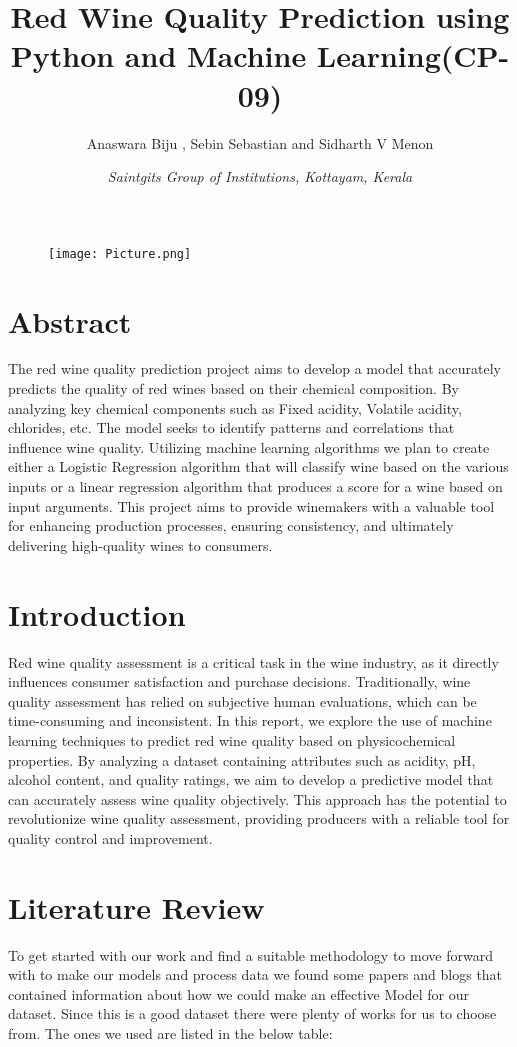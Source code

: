 \documentclass{article}
\title{\textbf{Red Wine Quality Prediction using Python and Machine Learning(CP-09)}}
\author{Anaswara Biju , Sebin Sebastian and Sidharth V Menon}
\date{\textit{Saintgits Group of Institutions, Kottayam, Kerala}}
\begin{document}
\begin{figure}[t]
\texttt{[image: Picture.png]}

\end{figure}
\maketitle


\section{Abstract}
The red wine quality prediction project aims to develop a model that accurately predicts the quality of red wines based on their chemical composition. By analyzing key chemical components such as Fixed acidity, Volatile acidity, chlorides, etc. The model seeks to identify patterns and correlations that influence wine quality. Utilizing machine learning algorithms we plan to create either a Logistic Regression algorithm that will classify wine based on the various inputs or a linear regression algorithm that produces a score for a wine based on input arguments. This project aims to provide winemakers with a valuable tool for enhancing production processes, ensuring consistency, and ultimately delivering high-quality wines to consumers.

\section{Introduction}
Red wine quality assessment is a critical task in the wine industry, as it directly influences consumer satisfaction and purchase decisions. Traditionally, wine quality assessment has relied on subjective human evaluations, which can be time-consuming and inconsistent. In this report, we explore the use of machine learning techniques to predict red wine quality based on physicochemical properties. By analyzing a dataset containing attributes such as acidity, pH, alcohol content, and quality ratings, we aim to develop a predictive model that can accurately assess wine quality objectively. This approach has the potential to revolutionize wine quality assessment, providing producers with a reliable tool for quality control and improvement.
\section{Literature Review}
To get started with our work and find a suitable methodology to move forward with to make our models and process data we found some papers and blogs that contained information about how we could make an effective Model for our dataset.
Since this is a good dataset there were plenty of works for us to choose from. The ones we used are listed in the below table:
\end{document}
